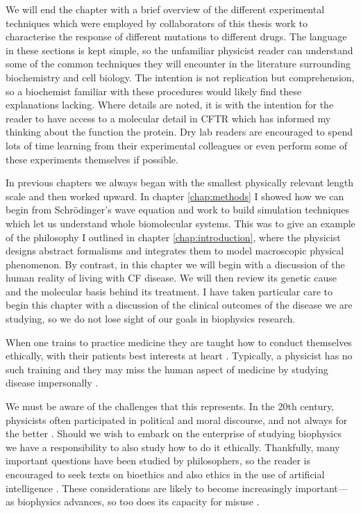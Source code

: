 We will end the chapter with a brief overview of the different experimental techniques which were employed by collaborators of this thesis work to characterise the response of different mutations to different drugs. The language in these sections is kept simple, so the unfamiliar physicist reader can understand some of the common techniques they will encounter in the literature surrounding biochemistry and cell biology. The intention is not replication but comprehension, so a biochemist familiar with these procedures would likely find these explanations lacking. Where details are noted, it is with the intention for the reader to have access to a molecular detail in CFTR which has informed my thinking about the function the protein. Dry lab readers are encouraged to spend lots of time learning from their experimental colleagues or even perform some of these experiments themselves if possible. 

In previous chapters we always began with the smallest physically relevant length scale and then worked  upward. In chapter \ref{chap:methods} I showed how we can begin from Schr\"odinger's wave equation and work to build simulation techniques which let us understand whole biomolecular systems. This was to give an example of the philosophy I outlined in chapter \ref{chap:introduction}, where the physicist designs abstract formalisms and integrates them to model macroscopic physical phenomenon. By contrast, in this chapter we will begin with a discussion of the human reality of living with CF disease. We will then review its genetic cause and the molecular basis behind its treatment. I have taken particular care to begin this chapter with a discussion of the clinical outcomes of the disease we are studying, so we do not lose sight of our goals in biophysics research.

When one trains to practice medicine they are taught how to conduct themselves ethically, with their patients best interests at heart \cite{hajar2017}. Typically, a physicist has no such training and they may miss the human aspect of medicine by studying disease impersonally \cite{foucault1994}. 

We must be aware of the challenges that this represents. In the 20th century, physicists often participated in political and moral discourse, and not always for the better \cite{frank1993, gottfried1999, global2009, rhodes1986, aaronson2008, berger2016, vonneumann_britanica}. Should we wish to embark on the enterprise of studying biophysics we have a responsibility to also study how to do it ethically. Thankfully, many important questions have been studied by philosophers, so the reader is encouraged to seek texts on bioethics and also ethics in the use of artificial intelligence \cite{buchanan2000, taneri2011, genome_editting_guildelines_2017, muller2021, bostrom2014}. These considerations are likely to become increasingly important---as biophysics advances, so too does its capacity for misuse \cite{mallapaty2022, urbina2022}. 

